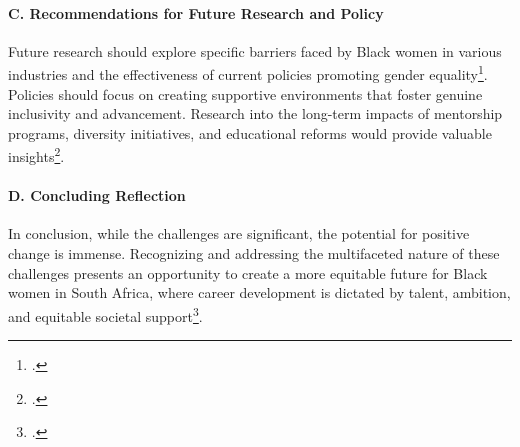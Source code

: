 \documentclass{article}
\begin{document}
\paragraph{C. Recommendations for Future Research and Policy}
Future research should explore specific barriers faced by Black women in various industries and the effectiveness of current policies promoting gender equality\footcite{francis2022black}. Policies should focus on creating supportive environments that foster genuine inclusivity and advancement. Research into the long-term impacts of mentorship programs, diversity initiatives, and educational reforms would provide valuable insights\footcite{matotoka2021mainstreaming}.

\paragraph{D. Concluding Reflection}
In conclusion, while the challenges are significant, the potential for positive change is immense. Recognizing and addressing the multifaceted nature of these challenges presents an opportunity to create a more equitable future for Black women in South Africa, where career development is dictated by talent, ambition, and equitable societal support\footcite{riordan2011career}.

\newpage

\printbibliography
\end{document}
